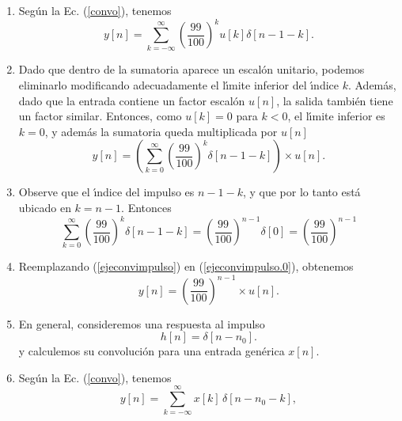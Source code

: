 \begin{enumerate}
\item Seg\'{u}n la Ec. (\ref{convo}), tenemos
  \begin{equation}
    y\left[ n\right] =
    \sum_{k=-\infty }^{\infty }\left( \frac{99}{100}\right) ^{k}u \left[ k\right] \delta \left[ n-1-k\right].
  \end{equation}

\item Dado que dentro de la sumatoria aparece un escal\'{o}n unitario,
  podemos eliminarlo modificando adecuadamente el l\'{\i}mite inferior
  del \'{\i}ndice $k$.  Además, dado que la entrada contiene un factor escalón $u[n]$, la salida también tiene un factor similar. Entonces, 
  como $u[k] = 0$ para $k < 0$, el l\'{\i}mite
  inferior es $k = 0$, y además la sumatoria queda multiplicada por $u[n]$
  \begin{equation}
    y\left[ n\right] =\left(\sum_{k=0}^{\infty }\left( \frac{99}{100}\right) ^{k}\delta \left[ n-1-k\right]\right) \times u[n]. \label{ejeconvimpulso.0}
  \end{equation}

\item Observe que el \'{\i}ndice del impulso es $n - 1 - k$, y que por
  lo tanto est\'{a} ubicado en $k = n - 1$. Entonces
  \begin{equation}
    \sum_{k=0}^{\infty}\left( \frac{99}{100}\right) ^{k}\delta \left[ n-1-k\right] = 
    \left( \frac{99}{100}\right) ^{n-1}\delta \left[0\right] =
    \left( \frac{99}{100}\right) ^{n-1}
     \label{ejeconvimpulso}
  \end{equation}

\item Reemplazando (\ref{ejeconvimpulso}) en (\ref{ejeconvimpulso.0}), obtenemos
  \begin{equation}
  	y[n] = 
    \left( \frac{99}{100}\right) ^{n-1}
     \times u[n] .
  \end{equation}

\item En general, consideremos una respuesta al impulso
  \begin{equation}
    h\left[ n\right] = \delta \left[ n-n_{0}\right] .
  \end{equation}
  y calculemos su convoluci\'{o}n para una entrada gen\'{e}rica
  $x[n]$.

\item Seg\'{u}n la Ec. (\ref{convo}), tenemos
  \begin{equation}
    y\left[ n\right] =\sum_{k=-\infty }^{\infty } x[k] \, \delta \left[ n-n_{0}-k\right] ,
  \end{equation}


\end{enumerate}

